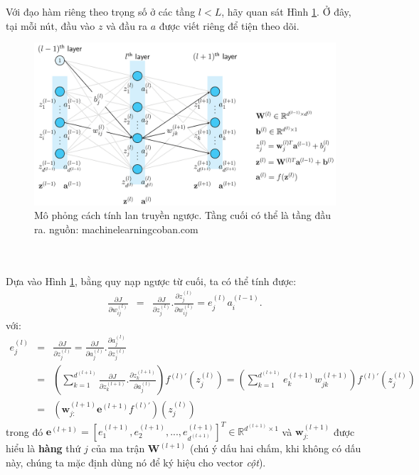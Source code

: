 \documentclass{article}
\begin{document}
Với đạo hàm riêng theo trọng số ở các tầng $l < L$, hãy quan sát Hình
\ref{fig19}. Ở đây, tại mỗi nút, đầu vào $z$ và đầu ra $a$ được viết
riêng để tiện theo dõi.
\begin{figure}[ht!]
    \centering
    \includegraphics[width = \linewidth]{backpropagation.png}
    \caption{Mô phỏng cách tính lan truyền ngược. Tầng cuối có thể là tầng đầu ra. nguồn: machinelearningcoban.com}
    \label{fig19}
\end{figure}
\\\\
Dựa vào Hình \ref{fig19}, bằng quy nạp ngược từ cuối, ta có thể tính được:
\begin{eqnarray}
\frac{\partial J}{\partial w_{ij}^{(l)}} &=& \frac{\partial J}{\partial
z_j^{(l)}}. \frac{\partial z_j^{(l)}}{\partial w_{ij}^{(l)}} = e_j^{(l)} a_i^{(l-1)}.
\end{eqnarray}
với:
\begin{eqnarray*}
e_j^{(l)} &=& \frac{\partial J}{\partial z_j^{(l)}} = \frac{\partial J}{\partial a_j^{(l)}} . \frac{\partial a_j^{(l)}}{\partial z_j^{(l)}} \\\
&=& \left( \sum_{k = 1}^{d^{(l+1)}} \frac{\partial J}{\partial z_k^{(l+1)}}
.\frac{\partial z_k^{(l+1)}}{\partial a_j^{(l)}} \right) f^{(l)'}(z_j^{(l)}) =\left( \sum_{k = 1}^{d^{(l+1)}} e_k^{(l+1)} w_{jk}^{(l+1)} \right)
f^{(l)'}(z_j^{(l)}) \\
&=& \left(\textbf{w}_{j:}^{(l+1)}\textbf{e}^{(l+1)}f^{(l)'}\right)(z_j^{(l)})
\end{eqnarray*}
trong đó $\mathbf{e}^{(l+1)} = [e_1^{(l+1)}, e_2^{(l+1)}, ...,
e_{d^{(l+1)}}^{(l+1)}]^T \in \mathbb{R}^{d^{(l+1)}\times 1} $ và
$\mathbf{w}_{j:}^{(l+1)}$ được hiểu là \textbf{hàng} thứ $j$ của ma trận
$\mathbf{W}^{(l+1)}$ (chú ý dấu hai chấm, khi không có dấu này, chúng ta mặc
định dùng nó để ký hiệu cho vector \textit{cột}).
\end{document}

